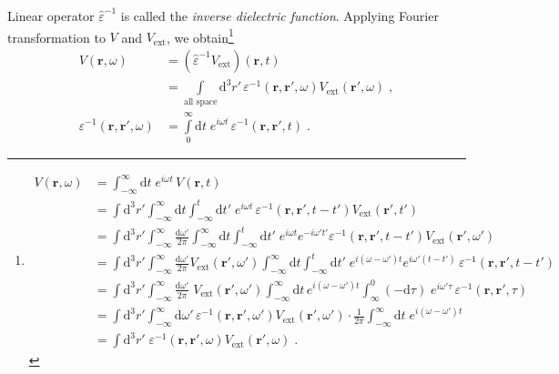 \documentclass[a4paper,12pt]{article}
\begin{document}
    Linear operator $\hat\varepsilon^{-1}$ is called the \textit{inverse dielectric function}. Applying Fourier transformation to $V$ and $V_\text{ext}$, we obtain\footnote{ %
\begin{equation*}
\begin{aligned}
    V(\mathbf{r}, \omega) 
        &= \int_{-\infty}^{\infty}\!\!\!\! \text{d}t \; e^{i\omega t}\, V(\mathbf{r}, t) \\
        &= \int\!\! \text{d}^3 r' \!\!
           \int_{-\infty}^{\infty}\!\!\!\! \text{d}t 
           \int_{-\infty}^{t}\!\!\!\! \text{d} t' \;
           e^{i\omega t}\, \varepsilon^{-1}(\mathbf{r}, \mathbf{r'}, t - t') V_\text{ext}(\mathbf{r'}, t') \\
        &= \int\!\! \text{d}^3 r' \!\!
           \int_{-\infty}^{\infty}\! \frac{\text{d}\omega'}{2\pi} 
           \int_{-\infty}^{\infty}\!\!\!\! \text{d}t
           \int_{-\infty}^{t}\!\!\!\! \text{d}t' \;
           e^{i\omega t}e^{-i\omega' t'} \varepsilon^{-1}(\mathbf{r}, \mathbf{r'}, t - t') V_\text{ext}(\mathbf{r'}, \omega') \\
        &= \int\!\! \text{d}^3 r' \!\!
           \int_{-\infty}^{\infty}\! \frac{\text{d}\omega'}{2\pi} V_\text{ext}(\mathbf{r'}, \omega')
           \int_{-\infty}^{\infty}\!\!\!\! \text{d}t
           \int_{-\infty}^{t}\!\!\!\! \text{d}t' \;
           e^{i(\omega - \omega')t}e^{i\omega' (t - t')} \, \varepsilon^{-1}(\mathbf{r}, \mathbf{r'}, t - t')  \\
        &= \int\!\! \text{d}^3 r' \!\!
           \int_{-\infty}^{\infty}\! \frac{\text{d}\omega'}{2\pi} \; V_\text{ext}(\mathbf{r'}, \omega')
           \int_{-\infty}^{\infty}\!\!\!\! \text{d}t \, e^{i(\omega - \omega')t}
           \int_{\infty}^{0}\!\! (-\text{d}\tau) \;
           e^{i\omega' \tau} \, \varepsilon^{-1}(\mathbf{r}, \mathbf{r'}, \tau)  \\
        &= \int\!\! \text{d}^3 r' \!\!
           \int_{-\infty}^{\infty} \!\!\!\! \text{d}\omega' \,
           \varepsilon^{-1}(\mathbf{r}, \mathbf{r'}, \omega') V_\text{ext}(\mathbf{r'}, \omega')
           \cdot \frac{1}{2\pi}\int_{-\infty}^{\infty}\!\! \text{d}t \; e^{i(\omega - \omega')t} \\
        &= \int\!\! \text{d}^3 r' \;
           \varepsilon^{-1}(\mathbf{r}, \mathbf{r'}, \omega) V_\text{ext}(\mathbf{r'}, \omega)\; .
\end{aligned}
\end{equation*}
}
    \begin{equation*}
        \begin{aligned}
        V(\mathbf{r}, \omega) 
            &= \left( \hat\varepsilon^{-1} V_\text{ext} \right)(\mathbf{r}, t) \\
            &= \int\limits_{\text{all space}}\!\!\!\!\!\! \text{d}^3 r' \, \varepsilon^{-1}(\mathbf{r}, \mathbf{r'}, \omega) V_\text{ext}(\mathbf{r'}, \omega)\; , \\
        \varepsilon^{-1}(\mathbf{r},\mathbf{r'},\omega) &= \int\limits_0^\infty \! \text{d}t \; e^{i\omega t}\,\varepsilon^{-1}(\mathbf{r}, \mathbf{r'}, t)\; .
        \end{aligned}
    \end{equation*}
   
\end{document}
